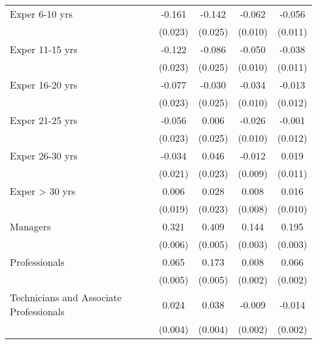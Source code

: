 \begin{table}[htbp]
\begin{tabular}{l*{4}{c}}
Exper 6-10 yrs      &      -0.161\sym{***}&      -0.142\sym{***}&      -0.062\sym{***}&      -0.056\sym{***}\\
                    &     (0.023)         &     (0.025)         &     (0.010)         &     (0.011)         \\
Exper 11-15 yrs     &      -0.122\sym{***}&      -0.086\sym{***}&      -0.050\sym{***}&      -0.038\sym{***}\\
                    &     (0.023)         &     (0.025)         &     (0.010)         &     (0.011)         \\
Exper 16-20 yrs     &      -0.077\sym{***}&      -0.030         &      -0.034\sym{***}&      -0.013         \\
                    &     (0.023)         &     (0.025)         &     (0.010)         &     (0.012)         \\
Exper 21-25 yrs     &      -0.056\sym{*}  &       0.006         &      -0.026\sym{**} &      -0.001         \\
                    &     (0.023)         &     (0.025)         &     (0.010)         &     (0.012)         \\
Exper 26-30 yrs     &      -0.034         &       0.046\sym{*}  &      -0.012         &       0.019         \\
                    &     (0.021)         &     (0.023)         &     (0.009)         &     (0.011)         \\
Exper > 30 yrs      &       0.006         &       0.028         &       0.008         &       0.016         \\
                    &     (0.019)         &     (0.023)         &     (0.008)         &     (0.010)         \\
Managers            &       0.321\sym{***}&       0.409\sym{***}&       0.144\sym{***}&       0.195\sym{***}\\
                    &     (0.006)         &     (0.005)         &     (0.003)         &     (0.003)         \\
Professionals       &       0.065\sym{***}&       0.173\sym{***}&       0.008\sym{***}&       0.066\sym{***}\\
                    &     (0.005)         &     (0.005)         &     (0.002)         &     (0.002)         \\
Technicians and Associate Professionals&       0.024\sym{***}&       0.038\sym{***}&      -0.009\sym{***}&      -0.014\sym{***}\\
                    &     (0.004)         &     (0.004)         &     (0.002)         &     (0.002)         \\

\end{tabular}
\end{table}
